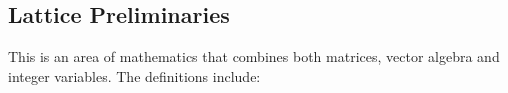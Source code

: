 

\subsection{Lattice Preliminaries}
\label{ssub:The mathematics}
This is an area of mathematics that combines both matrices, vector algebra
and integer variables. The definitions include:

